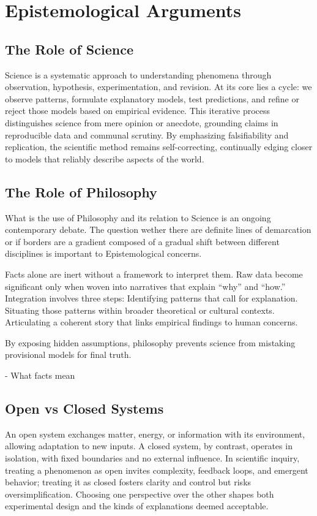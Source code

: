 \documentclass[a4paper]{article}
\begin{document}
\section{Epistemological Arguments}
\subsection{The Role of Science}
Science is a systematic approach to understanding phenomena through observation, hypothesis, experimentation, and revision. 
At its core lies a cycle: we observe patterns, formulate explanatory models, test predictions, and refine or reject those models based on empirical evidence. 
This iterative process distinguishes science from mere opinion or anecdote, grounding claims in reproducible data and communal scrutiny. 
By emphasizing falsifiability and replication, the scientific method remains self-correcting, continually edging closer to models that reliably describe aspects of the world.


\subsection{The Role of Philosophy}
What is the use of Philosophy and its relation to Science is an ongoing contemporary debate. 
The question wether there are definite lines of demarcation or if borders are a gradient composed of a gradual shift between different disciplines is important to Epistemological concerns.

Facts alone are inert without a framework to interpret them. 
Raw data become significant only when woven into narratives that explain “why” and “how.” 
Integration involves three steps:
    Identifying patterns that call for explanation.
    Situating those patterns within broader theoretical or cultural contexts.
    Articulating a coherent story that links empirical findings to human concerns.

By exposing hidden assumptions, philosophy prevents science from mistaking provisional models for final truth.

- What facts mean

\subsection{Open vs Closed Systems}
An open system exchanges matter, energy, or information with its environment, allowing adaptation to new inputs. 
A closed system, by contrast, operates in isolation, with fixed boundaries and no external influence. 
In scientific inquiry, treating a phenomenon as open invites complexity, feedback loops, and emergent behavior; treating it as closed fosters clarity and control but risks oversimplification. 
Choosing one perspective over the other shapes both experimental design and the kinds of explanations deemed acceptable.
\end{document}
